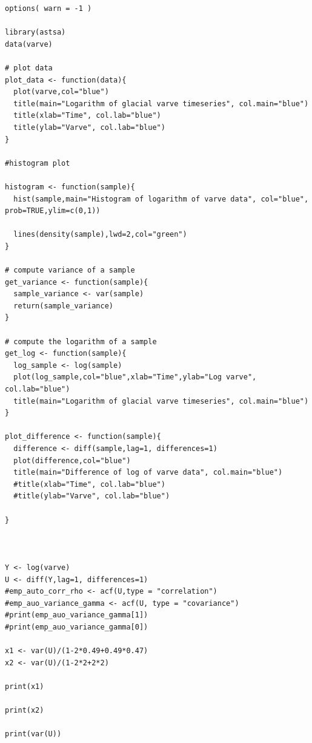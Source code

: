 \documentclass[11pt, oneside]{article}   	%
\begin{document}
\begin{lstlisting}
options( warn = -1 )

library(astsa)
data(varve)

# plot data
plot_data <- function(data){
  plot(varve,col="blue")
  title(main="Logarithm of glacial varve timeseries", col.main="blue")
  title(xlab="Time", col.lab="blue")
  title(ylab="Varve", col.lab="blue")
}

#histogram plot

histogram <- function(sample){
  hist(sample,main="Histogram of logarithm of varve data", col="blue", prob=TRUE,ylim=c(0,1))

  lines(density(sample),lwd=2,col="green")
}

# compute variance of a sample
get_variance <- function(sample){
  sample_variance <- var(sample)
  return(sample_variance)
}

# compute the logarithm of a sample
get_log <- function(sample){
  log_sample <- log(sample)
  plot(log_sample,col="blue",xlab="Time",ylab="Log varve", col.lab="blue")
  title(main="Logarithm of glacial varve timeseries", col.main="blue")
}

plot_difference <- function(sample){
  difference <- diff(sample,lag=1, differences=1)
  plot(difference,col="blue")
  title(main="Difference of log of varve data", col.main="blue")
  #title(xlab="Time", col.lab="blue")
  #title(ylab="Varve", col.lab="blue")

}



Y <- log(varve)
U <- diff(Y,lag=1, differences=1)
#emp_auto_corr_rho <- acf(U,type = "correlation")
#emp_auo_variance_gamma <- acf(U, type = "covariance")
#print(emp_auo_variance_gamma[1])
#print(emp_auo_variance_gamma[0])

x1 <- var(U)/(1-2*0.49+0.49*0.47)
x2 <- var(U)/(1-2*2+2*2)

print(x1)

print(x2)

print(var(U))

\end{lstlisting}
\end{document}
